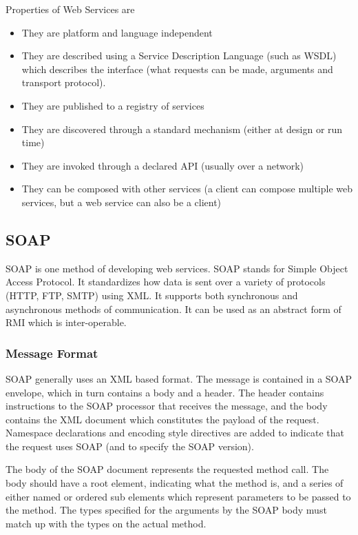 \documentclass{article}
\begin{document}
Properties of Web Services are

\begin{itemize}
    \item They are platform and language independent
    \item They are described using a Service Description Language (such as WSDL) which describes the interface (what requests can be made, arguments and transport protocol).
    \item They are published to a registry of services
    \item They are discovered through a standard mechanism (either at design or run time)
    \item They are invoked through a declared API (usually over a network)
    \item They can be composed with other services (a client can compose multiple web services, but a web service can also be a client)
\end{itemize}

\subsection{SOAP}
SOAP is one method of developing web services. SOAP stands for Simple Object Access Protocol. It standardizes how data is sent over a variety of protocols (HTTP, FTP, SMTP) using XML. It supports both synchronous and asynchronous methods of communication. It can be used as an abstract form of RMI which is inter-operable. 

\subsubsection{Message Format}
SOAP generally uses an XML based format. The message is contained in a SOAP envelope, which in turn contains a body and a header. The header contains instructions to the SOAP processor that receives the message, and the body contains the XML document which constitutes the payload of the request. Namespace declarations and encoding style directives are added to indicate that the request uses SOAP (and to specify the SOAP version). 

The body of the SOAP document represents the requested method call. The body should have a root element, indicating what the method is, and a series of either named or ordered sub elements which represent parameters to be passed to the method. The types specified for the arguments by the SOAP body must match up with the types on the actual method.
\end{document}
